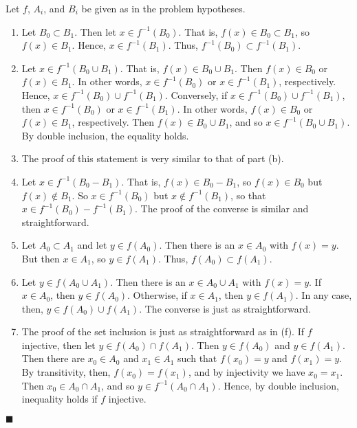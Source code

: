 \documentclass[12pt]{article}
\renewcommand{\qed}{\hfill$\blacksquare$}
\renewenvironment{proof}{\begin{addmargin}[1em]{0em}\begin{newproof}}{\end{newproof}\end{addmargin}\qed}
\begin{document}
\begin{proof}
Let $f$, $A_i$, and $B_i$ be given as in the problem hypotheses.
\begin{enumerate}[label=(\alph*)]
	\item Let $B_0 \subset B_1$. Then let $x \in f^{-1}\left(B_0\right)$. That is, $f\left(x\right) \in B_0 \subset B_1$, so $f\left(x\right) \in B_1$. Hence, $x \in f^{-1}\left(B_1\right)$. Thus, $f^{-1}\left(B_0\right) \subset f^{-1}\left(B_1\right)$.
	\item Let $x\in f^{-1}\left(B_0 \cup B_1\right)$. That is, $f\left(x\right) \in B_0 \cup B_1$. Then $f\left(x\right) \in B_0$ or $f\left(x\right) \in B_1$. In other words, $x\in f^{-1}\left(B_0\right)$ or $x \in f^{-1}\left(B_1\right)$, respectively. Hence, $x \in f^{-1}\left(B_0\right)\cup f^{-1}\left(B_1\right)$. Conversely, if $x \in  f^{-1}\left(B_0\right)\cup f^{-1}\left(B_1\right)$, then $x \in f^{-1}\left(B_0\right)$ or $x\in f^{-1}\left(B_1\right)$. In other words, $f\left(x\right) \in B_0$ or $f\left(x\right) \in B_1$, respectively. Then $f\left(x\right) \in B_0 \cup B_1$, and so $x \in f^{-1}\left(B_0 \cup B_1\right)$. By double inclusion, the equality holds.
	\item The proof of this statement is very similar to that of part (b).
	\item Let $x \in f^{-1}\left(B_0 - B_1 \right)$. That is, $f\left(x\right) \in B_0 - B_1$, so $f\left(x\right) \in B_0$ but $f\left(x\right) \notin B_1$. So $x \in f^{-1}\left(B_0\right)$ but $x \notin f^{-1}\left(B_1\right)$, so that $x \in f^{-1}\left(B_0\right) - f^{-1}\left(B_1\right)$. The proof of the converse is similar and straightforward.
	\item Let $A_0 \subset A_1$ and let $y \in f\left(A_0\right)$. Then there is an $x \in A_0$ with $f\left(x\right) = y$. But then $x \in A_1$, so $y \in f\left(A_1\right)$. Thus, $f\left(A_0\right) \subset f\left(A_1\right)$.
	\item Let $y \in f\left(A_0 \cup A_1\right)$. Then there is an $x \in A_0 \cup A_1$ with $f\left(x\right) = y$. If $ x \in A_0$, then $y \in f\left(A_0\right)$. Otherwise, if $x \in A_1$, then $y\in f\left(A_1\right)$. In any case, then, $y \in f\left(A_0\right)\cup f\left(A_1\right)$. The converse is just as straightforward.
	\item The proof of the set inclusion is just as straightforward as in (f). If $f$ injective, then let $y \in f\left(A_0\right)\cap f\left(A_1\right)$. Then $y \in f\left(A_0\right)$ and $y \in f\left(A_1\right)$. Then there are $x_0 \in A_0$ and $x_1 \in A_1$ such that $f\left(x_0\right) = y$ and $f\left(x_1\right)=y$. By transitivity, then, $f\left(x_0\right) = f\left(x_1\right)$, and by injectivity we have $x_0 = x_1$. Then $x_0 \in A_0 \cap A_1$, and so $y \in f^{-1}\left(A_0 \cap A_1\right)$. Hence, by double inclusion, inequality holds if $f$ injective.

\end{enumerate}
\end{proof}
\end{document}
